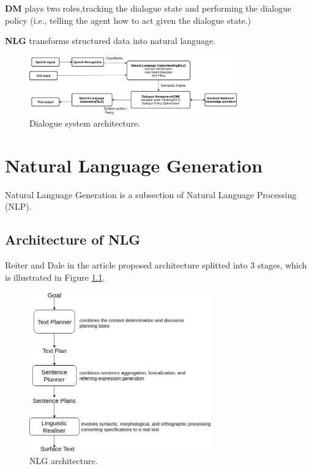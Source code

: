 \textbf{DM} plays two roles,tracking the dialogue state and performing the dialogue policy (i.e., telling the agent how to act given the dialogue state.)

\textbf{NLG} transforms structured data into natural language.\cite{open_domain_neural_ds}
\begin{figure}[hbt]
  \centering
  \includegraphics[width=0.8\textwidth]{figures/ds_arcitecture.jpg}
  \caption{Dialogue system architecture.}
  \label{ds architecture}
\end{figure}

\chapter{Natural Language Generation}\label{nlg}
Natural Language Generation is a subsection of Natural Language Processing (NLP).

\section{Architecture of NLG}
  Reiter and Dale in the article \cite{applied_nlg} proposed architecture splitted into 3 stages, which is illustrated in Figure \ref{nlg architecture}. 
\begin{figure}[hbt]
  \centering
  \includegraphics[width=0.7\textwidth]{figures/nlg_architecture.jpg}
  \caption{NLG architecture.}
  \label{nlg architecture}
\end{figure}

